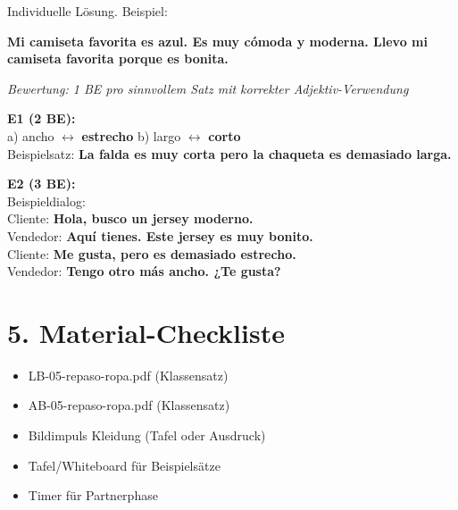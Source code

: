 \documentclass[11pt, a4paper]{article}
\newcommand{\lsg}[1]{\textcolor{loesung}{\textbf{#1}}}
\begin{document}
\begin{loesungsbox}
\small
Individuelle Lösung. Beispiel:

\lsg{Mi camiseta favorita es azul. Es muy cómoda y moderna. Llevo mi camiseta favorita porque es bonita.}

\textit{Bewertung: 1 BE pro sinnvollem Satz mit korrekter Adjektiv-Verwendung}
\end{loesungsbox}

\begin{loesungsbox}
\small
\textbf{E1 (2 BE):}\\
a) ancho $\leftrightarrow$ \lsg{estrecho} \quad b) largo $\leftrightarrow$ \lsg{corto}\\
Beispielsatz: \lsg{La falda es muy corta pero la chaqueta es demasiado larga.}

\vspace{4pt}
\textbf{E2 (3 BE):}\\
Beispieldialog:\\
Cliente: \lsg{Hola, busco un jersey moderno.}\\
Vendedor: \lsg{Aquí tienes. Este jersey es muy bonito.}\\
Cliente: \lsg{Me gusta, pero es demasiado estrecho.}\\
Vendedor: \lsg{Tengo otro más ancho. ¿Te gusta?}
\end{loesungsbox}


\section*{5. Material-Checkliste}

\begin{itemize}[leftmargin=*, itemsep=2pt]
    \item[$\Box$] LB-05-repaso-ropa.pdf (Klassensatz)
    \item[$\Box$] AB-05-repaso-ropa.pdf (Klassensatz)
    \item[$\Box$] Bildimpuls Kleidung (Tafel oder Ausdruck)
    \item[$\Box$] Tafel/Whiteboard für Beispielsätze
    \item[$\Box$] Timer für Partnerphase
\end{itemize}

\end{document}

